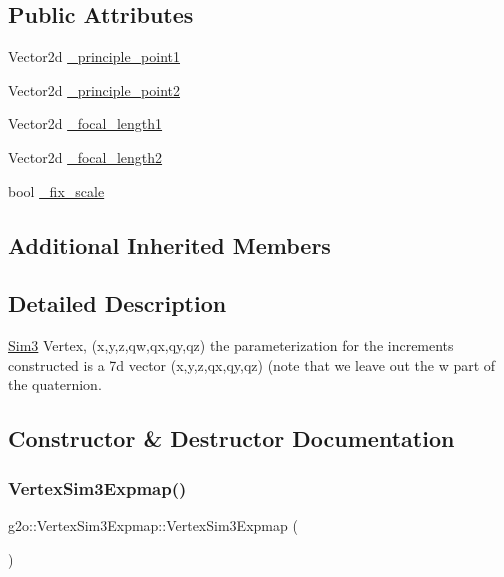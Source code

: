 \subsection*{Public Attributes}
\begin{DoxyCompactItemize}
\item 
Vector2d \mbox{\hyperlink{classg2o_1_1_vertex_sim3_expmap_a0bf270a1f6d9f45e5b1ee683d4877e1d}{\+\_\+principle\+\_\+point1}}
\item 
Vector2d \mbox{\hyperlink{classg2o_1_1_vertex_sim3_expmap_aae09e8dc5707e524901e49af4d022edb}{\+\_\+principle\+\_\+point2}}
\item 
Vector2d \mbox{\hyperlink{classg2o_1_1_vertex_sim3_expmap_a05a79614b17cc700acaeb86039c2e181}{\+\_\+focal\+\_\+length1}}
\item 
Vector2d \mbox{\hyperlink{classg2o_1_1_vertex_sim3_expmap_a05c121f708922185d7b0823251c28290}{\+\_\+focal\+\_\+length2}}
\item 
bool \mbox{\hyperlink{classg2o_1_1_vertex_sim3_expmap_a63854235b605e45825798d327890930e}{\+\_\+fix\+\_\+scale}}
\end{DoxyCompactItemize}
\subsection*{Additional Inherited Members}


\subsection{Detailed Description}
\mbox{\hyperlink{structg2o_1_1_sim3}{Sim3}} Vertex, (x,y,z,qw,qx,qy,qz) the parameterization for the increments constructed is a 7d vector (x,y,z,qx,qy,qz) (note that we leave out the w part of the quaternion. 

\subsection{Constructor \& Destructor Documentation}
\mbox{\label{classg2o_1_1_vertex_sim3_expmap_ac1f5a851bf896518998d8186723af365}} 
\subsubsection{\texorpdfstring{Vertex\+Sim3\+Expmap()}{VertexSim3Expmap()}}
{\footnotesize\ttfamily g2o\+::\+Vertex\+Sim3\+Expmap\+::\+Vertex\+Sim3\+Expmap (\begin{DoxyParamCaption}{ }\end{DoxyParamCaption})}



